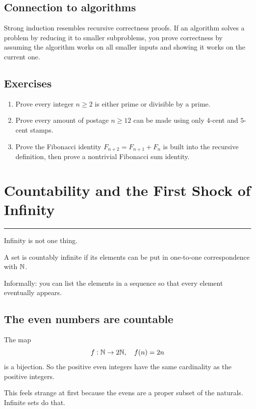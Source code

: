 \documentclass[12pt]{article}
\newcommand{\chapterline}{\vspace{0.4em}\hrule\vspace{0.8em}}
\begin{document}
\subsection{Connection to algorithms}

Strong induction resembles recursive correctness proofs. If an algorithm solves a problem by reducing it to smaller subproblems, you prove correctness by assuming the algorithm works on all smaller inputs and showing it works on the current one.

\subsection{Exercises}

\begin{enumerate}
\item Prove every integer $n\geq2$ is either prime or divisible by a prime.
\item Prove every amount of postage $n\geq12$ can be made using only $4$-cent and $5$-cent stamps.
\item Prove the Fibonacci identity $F_{n+2}=F_{n+1}+F_n$ is built into the recursive definition, then prove a nontrivial Fibonacci sum identity.
\end{enumerate}

\newpage
\section{Countability and the First Shock of Infinity}
\chapterline

Infinity is not one thing.

\begin{definition}
A set is countably infinite if its elements can be put in one-to-one correspondence with $\mathbb{N}$.
\end{definition}

Informally: you can list the elements in a sequence so that every element eventually appears.

\subsection{The even numbers are countable}

The map
\[
f:\mathbb{N}\to 2\mathbb{N},\quad f(n)=2n
\]
is a bijection. So the positive even integers have the same cardinality as the positive integers.

This feels strange at first because the evens are a proper subset of the naturals. Infinite sets do that.
\end{document}
